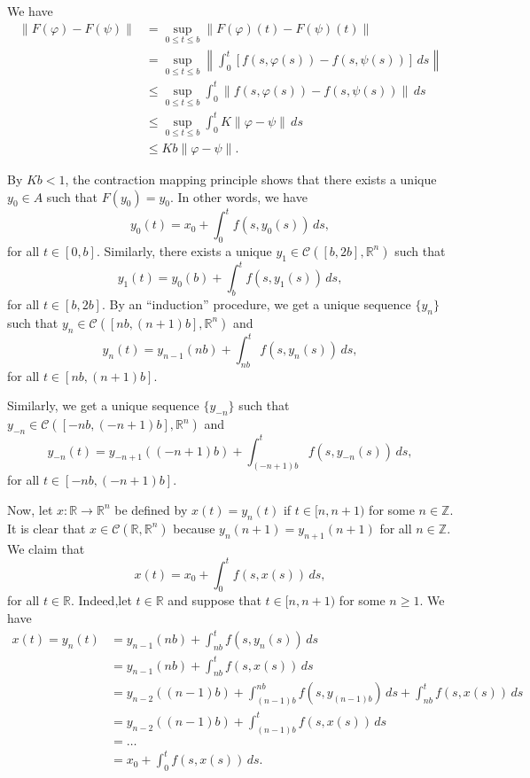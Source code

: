 \documentclass{article}
\begin{document}
We have \[\begin{aligned}
\|F(\varphi) - F(\psi)\| &= \sup_{0\le t \le b} \|F(\varphi)(t) - F(\psi)(t)\| \\
&= \sup_{0\le t\le b} \left\| \int_0^t [f(s,\varphi(s)) - f(s,\psi(s))]\,ds \right\| \\
&\le \sup_{0\le t\le b} \int_{0}^t \| f(s,\varphi(s)) - f(s,\psi(s)) \| \,ds\\
&\le \sup_{0\le t\le b}\int_{0}^t K\|\varphi - \psi\| \,ds \\
&\le Kb \|\varphi -\psi\|.
\end{aligned}\]

By $Kb < 1$, the contraction mapping principle shows that there exists a
unique $y_0 \in A$ such that $F(y_0) = y_0$. In other words, we have
\[ y_0(t) = x_0 + \int_0^t f(s, y_0(s))\, ds,\] for all $t\in [0,b]$.
Similarly, there exists a unique
$y_1\in \mathcal{C}([b,2b],\mathbb{R}^n)$ such that
\[ y_1(t) = y_0(b) + \int_b^t f(s,y_1(s))\,ds ,\] for all
$t \in [b,2b]$. By an ``induction'' procedure, we get a unique sequence
$\{y_n\}$ such that $y_n \in \mathcal{C}([nb,(n+1)b],\mathbb{R}^n)$ and
\[y_n(t) = y_{n-1}(nb) + \int_{nb}^t f(s,y_n(s))\,ds ,\] for all
$t \in [nb,(n+1)b]$.

Similarly, we get a unique sequence $\{y_{-n}\}$ such that
$y_{-n} \in \mathcal{C}([-nb, (-n+1)b],\mathbb{R}^n)$ and
\[y_{-n}(t) = y_{-n+1}((-n+1)b) + \int_{(-n+1)b}^t f(s,y_{-n}(s))\,ds,\]
for all $t \in [-nb, (-n+1)b]$.

Now, let $x:\mathbb{R}\to \mathbb{R}^n$ be defined by $x(t) = y_n(t)$ if
$t \in [n, n+1)$ for some $n\in \mathbb{Z}$. It is clear that
$x \in \mathcal{C}(\mathbb{R},\mathbb{R}^n)$ because
$y_n(n+1) = y_{n+1}(n+1)$ for all $n\in \mathbb{Z}$. We claim that
\[x(t) = x_0 + \int_0^t f(s, x(s))\,ds,\] for all $t\in \mathbb{R}$.
Indeed,let $t\in \mathbb{R}$ and suppose that $t \in [n, n+1)$ for some
$n\ge 1$. We have \[\begin{aligned}
x(t) = y_n(t) &= y_{n-1}(nb) +  \int_{nb}^t f(s,y_n(s))\,ds\\
& = y_{n-1}(nb) + \int_{nb}^t f(s,x(s)) \, ds \\
& = y_{n-2}((n-1)b) + \int_{(n-1)b}^{nb} f(s,y_{(n-1)b}) \, ds + \int_{nb}^t f(s,x(s))\, ds \\
& = y_{n-2}((n-1)b) + \int_{(n-1)b}^t f(s,x(s))\, ds \\
& = \ldots \\
& = x_0 + \int_0^t f(s,x(s)) \,ds.
\end{aligned}\]
\end{document}
